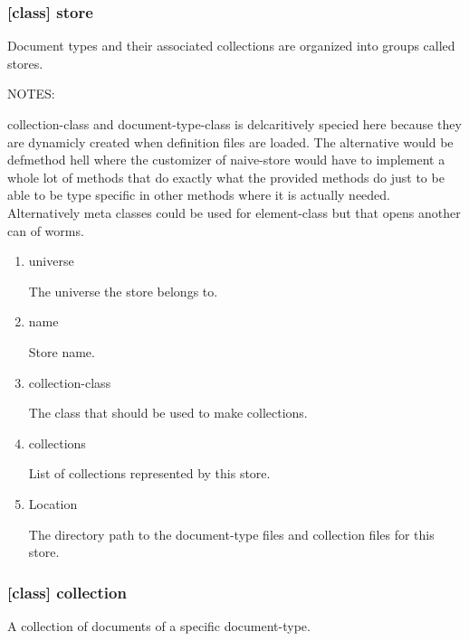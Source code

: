 \documentclass[11pt]{article}
\begin{document}
\subsubsection{[class] store}
\label{sec:orga635f19}

Document types and their associated collections are organized into
groups called stores.

NOTES:

collection-class and document-type-class is delcaritively specied here
because they are dynamicly created when definition files are
loaded. The alternative would be defmethod hell where the customizer
of naive-store would have to implement a whole lot of methods that do
exactly what the provided methods do just to be able to be type
specific in other methods where it is actually needed. Alternatively
meta classes could be used for element-class but that opens another
can of worms.

\begin{enumerate}
\item\relax [accessor] universe
\label{sec:orga5e0ef0}

The universe the store belongs to.

\item\relax [accessor] name
\label{sec:orge3172ac}

Store name.

\item\relax [accessor] collection-class
\label{sec:orgd5666c7}

The class that should be used to make collections.

\item\relax [accessor] collections
\label{sec:org4a1b510}

List of collections represented by this store.

\item\relax [accessor] Location
\label{sec:org9218007}

The directory path to the document-type files and collection files for
this store.
\end{enumerate}

\subsubsection{[class] collection}
\label{sec:orgea9645a}

A collection of documents of a specific document-type.
\end{document}
